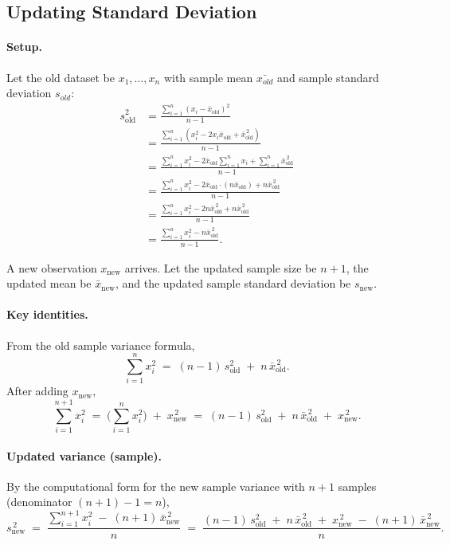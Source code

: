 \documentclass{report}
\begin{document}
\subsection{Updating Standard Deviation}

\paragraph{Setup.}
Let the old dataset be $x_1,\dots,x_n$ with sample mean $\bar{x_{old    }}$ and sample standard deviation $s_{old}$:\\

\[
\begin{aligned}
s_{\text{old}}^{2} 
&= \frac{\sum_{i=1}^{n} (x_i - \bar{x}_{\text{old}})^2}{n-1} \\[6pt]
&= \frac{\sum_{i=1}^{n} \left(x_i^2 - 2x_i\bar{x}_{\text{old}} + \bar{x}_{\text{old}}^{\,2}\right)}{n-1} \\[6pt]
&= \frac{\sum_{i=1}^{n} x_i^2 - 2\bar{x}_{\text{old}} \sum_{i=1}^{n} x_i + \sum_{i=1}^{n} \bar{x}_{\text{old}}^{\,2}}{n-1} \\[6pt]
&= \frac{\sum_{i=1}^{n} x_i^2 - 2\bar{x}_{\text{old}} \cdot (n\bar{x}_{\text{old}}) + n\bar{x}_{\text{old}}^{\,2}}{n-1} \\[6pt]
&= \frac{\sum_{i=1}^{n} x_i^2 - 2n\bar{x}_{\text{old}}^{\,2} + n\bar{x}_{\text{old}}^{\,2}}{n-1} \\[6pt]
&= \frac{\sum_{i=1}^{n} x_i^2 - n\bar{x}_{\text{old}}^{\,2}}{n-1}.
\end{aligned}
\]

A new observation $x_{\text{new}}$ arrives. Let the updated sample size be $n+1$, the updated mean be $\bar{x}_{\text{new}}$, and the updated sample standard deviation be $s_{\text{new}}$.

\paragraph{Key identities.}
From the old sample variance formula,
\[
\sum_{i=1}^{n} x_i^2 \;=\; (n-1)\,s_{\text{old}}^2 \;+\; n\,\bar{x}_{\text{old}}^{\,2}.
\]
After adding $x_{\text{new}}$,
\[
\sum_{i=1}^{n+1} x_i^2 \;=\; \Big(\sum_{i=1}^{n} x_i^2\Big) \;+\; x_{\text{new}}^{\,2}
\;=\; (n-1)\,s_{\text{old}}^2 \;+\; n\,\bar{x}_{\text{old}}^{\,2} \;+\; x_{\text{new}}^{\,2}.
\]

\paragraph{Updated variance (sample).}
By the computational form for the new sample variance with $n+1$ samples (denominator $(n+1)-1=n$),
\[
s_{\text{new}}^{\,2}
\;=\;
\frac{\displaystyle \sum_{i=1}^{n+1} x_i^2 \;-\; (n+1)\,\bar{x}_{\text{new}}^{\,2}}{n}
\;=\;
\frac{(n-1)\,s_{\text{old}}^2 \;+\; n\,\bar{x}_{\text{old}}^{\,2} \;+\; x_{\text{new}}^{\,2} \;-\; (n+1)\,\bar{x}_{\text{new}}^{\,2}}{n}.
\]
\end{document}
